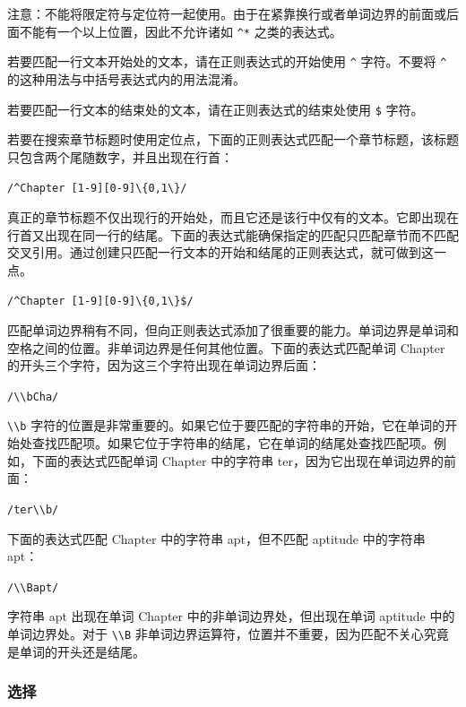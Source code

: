 \documentclass[doctor,openright,twoside]{sjtuthesis}
\newcommand{\passthrough}[1]{#1}
\theoremstyle{plain}
\theoremstyle{definition}
\theoremstyle{remark}
\theoremstyle{ocrenumbox}
\theoremstyle{plain}
\begin{document}
注意：不能将限定符与定位符一起使用。由于在紧靠换行或者单词边界的前面或后面不能有一个以上位置，因此不允许诸如
\passthrough{\lstinline!^*!} 之类的表达式。

若要匹配一行文本开始处的文本，请在正则表达式的开始使用
\passthrough{\lstinline!^!} 字符。不要将 \passthrough{\lstinline!^!}
的这种用法与中括号表达式内的用法混淆。

若要匹配一行文本的结束处的文本，请在正则表达式的结束处使用
\passthrough{\lstinline!$!} 字符。

若要在搜索章节标题时使用定位点，下面的正则表达式匹配一个章节标题，该标题只包含两个尾随数字，并且出现在行首：

\passthrough{\lstinline!/^Chapter [1-9][0-9]\{0,1\}/!}

真正的章节标题不仅出现行的开始处，而且它还是该行中仅有的文本。它即出现在行首又出现在同一行的结尾。下面的表达式能确保指定的匹配只匹配章节而不匹配交叉引用。通过创建只匹配一行文本的开始和结尾的正则表达式，就可做到这一点。

\passthrough{\lstinline!/^Chapter [1-9][0-9]\{0,1\}$/!}

匹配单词边界稍有不同，但向正则表达式添加了很重要的能力。单词边界是单词和空格之间的位置。非单词边界是任何其他位置。下面的表达式匹配单词
Chapter 的开头三个字符，因为这三个字符出现在单词边界后面：

\passthrough{\lstinline!/\\bCha/!}

\passthrough{\lstinline!\\b!}
字符的位置是非常重要的。如果它位于要匹配的字符串的开始，它在单词的开始处查找匹配项。如果它位于字符串的结尾，它在单词的结尾处查找匹配项。例如，下面的表达式匹配单词
Chapter 中的字符串 ter，因为它出现在单词边界的前面：

\passthrough{\lstinline!/ter\\b/!}

下面的表达式匹配 Chapter 中的字符串 apt，但不匹配 aptitude 中的字符串
apt：

\passthrough{\lstinline!/\\Bapt/!}

字符串 apt 出现在单词 Chapter 中的非单词边界处，但出现在单词 aptitude
中的单词边界处。对于 \passthrough{\lstinline!\\B!}
非单词边界运算符，位置并不重要，因为匹配不关心究竟是单词的开头还是结尾。

\subsubsection{选择}
\end{document}

